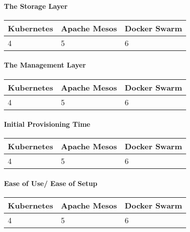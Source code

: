 \paragraph{The Storage Layer}

\begin{center}
  \begin{tabular}{ | p{4.2cm} | p{4.2cm} | p{4.2cm} | }
    \hline
    \textbf{Kubernetes}&\textbf{Apache Mesos}&\textbf{Docker Swarm}\\\hline
    4 & 5 & 6 \\
    \hline
  \end{tabular}
\end{center}

\paragraph{The Management Layer}

\begin{center}
  \begin{tabular}{ | p{4.2cm} | p{4.2cm} | p{4.2cm} | }
    \hline
    \textbf{Kubernetes}&\textbf{Apache Mesos}&\textbf{Docker Swarm}\\\hline
    4 & 5 & 6 \\
    \hline
  \end{tabular}
\end{center}

\paragraph{Initial Provisioning Time}

\begin{center}
  \begin{tabular}{ | p{4.2cm} | p{4.2cm} | p{4.2cm} | }
    \hline
    \textbf{Kubernetes}&\textbf{Apache Mesos}&\textbf{Docker Swarm}\\\hline
    4 & 5 & 6 \\
    \hline
  \end{tabular}
\end{center}

\paragraph{Ease of Use/ Ease of Setup}

\begin{center}
  \begin{tabular}{ | p{4.2cm} | p{4.2cm} | p{4.2cm} | }
    \hline
    \textbf{Kubernetes}&\textbf{Apache Mesos}&\textbf{Docker Swarm}\\\hline
    4 & 5 & 6 \\
    \hline
  \end{tabular}
\end{center}

